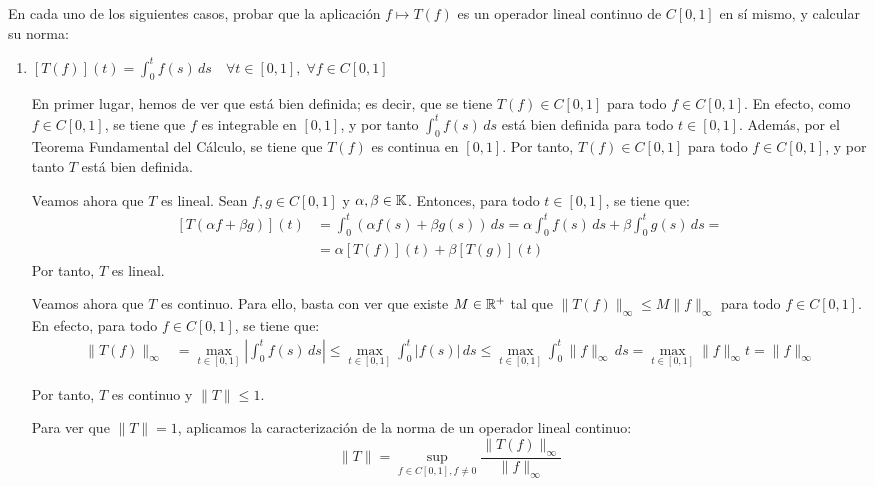 \begin{ejercicio}
En cada uno de los siguientes casos, probar que la aplicación $f \mapsto T(f)$ es un operador lineal continuo de $C\left[0, 1\right]$ en sí mismo, y calcular su norma:
\begin{enumerate}
    \item $\left[T(f)\right](t) = \int_{0}^t f(s)\,ds \quad \forall t \in \left[0, 1\right], \; \forall f \in C\left[0, 1\right]$
    
    En primer lugar, hemos de ver que está bien definida; es decir, que se tiene $T(f) \in C\left[0, 1\right]$ para todo $f \in C\left[0, 1\right]$. En efecto, como $f \in C\left[0, 1\right]$, se tiene que $f$ es integrable en $\left[0, 1\right]$, y por tanto $\int_{0}^t f(s)\,ds$ está bien definida para todo $t \in \left[0, 1\right]$. Además, por el Teorema Fundamental del Cálculo, se tiene que $T(f)$ es continua en $\left[0, 1\right]$. Por tanto, $T(f) \in C\left[0, 1\right]$ para todo $f \in C\left[0, 1\right]$, y por tanto $T$ está bien definida.

    Veamos ahora que $T$ es lineal. Sean $f, g \in C\left[0, 1\right]$ y $\alpha, \beta \in \mathbb{K}$. Entonces, para todo $t \in \left[0, 1\right]$, se tiene que:
    \begin{align*}
        \left[T(\alpha f + \beta g)\right](t) &= \int_{0}^t (\alpha f(s) + \beta g(s))\,ds = \alpha \int_{0}^t f(s)\,ds + \beta \int_{0}^t g(s)\,ds =\\&= \alpha \left[T(f)\right](t) + \beta \left[T(g)\right](t)
    \end{align*}
    Por tanto, $T$ es lineal.

    Veamos ahora que $T$ es continuo. Para ello, basta con ver que existe $M \in \mathbb{R}^+$ tal que $\|T(f)\|_\infty \leq M \|f\|_\infty$ para todo $f \in C\left[0, 1\right]$. En efecto, para todo $f \in C\left[0, 1\right]$, se tiene que:
    \begin{align*}
        \|T(f)\|_\infty &= \max_{t \in \left[0, 1\right]} \left|\int_{0}^t f(s)\,ds\right| \leq \max_{t \in \left[0, 1\right]} \int_{0}^t |f(s)|\,ds \leq \max_{t \in \left[0, 1\right]} \int_{0}^t \|f\|_\infty\,ds = \max_{t \in \left[0, 1\right]} \|f\|_\infty t = \|f\|_\infty
    \end{align*}

    Por tanto, $T$ es continuo y $\|T\| \leq 1$.

    Para ver que $\|T\| = 1$, aplicamos la caracterización de la norma de un operador lineal continuo:
    \begin{equation*}
        \|T\| = \sup_{f \in C\left[0, 1\right], f \neq 0} \frac{\|T(f)\|_\infty}{\|f\|_\infty}
    \end{equation*}
    

\end{enumerate}
\end{ejercicio}
